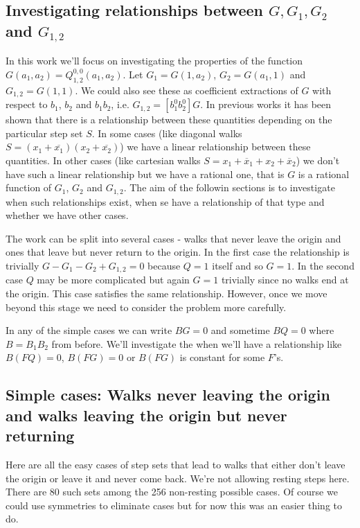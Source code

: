 \documentclass[12pt]{article}
\theoremstyle{definition} \newtheorem{definition}[theorem]{Definition}
\newcommand{\ol}[1]{\overline{#1}}
\newcommand{\Qf}[1]{Q_{1,2}^{#1}}
\begin{document}
\subsection{Investigating relationships between $G,G_1,G_2$ and $G_{1,2}$}

In this work we'll focus on investigating the properties of the function $G(a_1,a_2) = \Qf{0,0}(a_1,a_2)$. Let $G_1 = G(1,a_2)$, $G_2 = G(a_1,1)$ and $G_{1,2} = G(1,1)$. We could also see these as coefficient extractions of $G$ with respect to $b_1$, $b_2$ and $b_1b_2$, i.e. $G_{1,2} = [b_1^0b_2^0] G$. In previous works it has been shown that there is a relationship between these quantities depending on the particular step set $S$. In some cases (like diagonal walks $S = (x_1+\ol{x_1})(x_2+\ol{x_2})$) we have a linear relationship between these quantities. In other cases (like cartesian walks $S = x_1 +\ol{x}_1 + x_2 + \ol{x}_2$) we don't have such a linear relationship but we have a rational one, that is $G$ is a rational function of $G_1$, $G_2$ and $G_{1,2}$. The aim of the followin sections is to investigate when such relationships exist, when se have a relationship of that type and whether we have other cases.

The work can be split into several cases - walks that never leave the origin and ones that leave but never return to the origin. In the first case the relationship is trivially $G-G_1 - G_2 + G_{1,2} = 0$ because $Q = 1$ itself and so $G = 1$. In the second case $Q$ may be more complicated but again $G = 1$ trivially since no walks end at the origin. This case satisfies the same relationship. However, once we move beyond this stage we need to consider the problem more carefully.

In any of the simple cases we can write $BG = 0$ and sometime $BQ = 0$ where $B = B_1 B_2$ from before. We'll investigate the when we'll have a relationship like $B(FQ) = 0$, $B(FG) = 0$ or $B(FG)$ is constant for some $F$'s.

\subsection{Simple cases: Walks never leaving the origin and walks leaving the origin but never returning}
Here are all the easy cases of step sets that lead to walks that either don't leave the origin or leave it and never come back. We're not allowing resting steps here. There are 80 such sets among the 256 non-resting possible cases. Of course we could use symmetries to eliminate cases but for now this was an easier thing to do.
\end{document}
